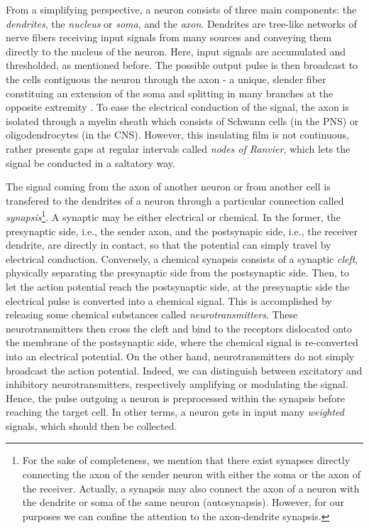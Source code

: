 \documentclass[12pt, a4paper, twoside, openright]{report}
\numberwithin{equation}{chapter}
\theoremstyle{theorem}
\theoremstyle{definition}
\theoremstyle{remark}
\theoremstyle{proposition}
\numberwithin{figure}{chapter}
\begin{document}
		From a simplifying perspective, a neuron consists of three main components: the \emph{dendrites}, the \emph{nucleus} or \emph{soma}, and the \emph{axon}. Dendrites are tree-like networks of nerve fibers receiving input signals from many sources and conveying them directly to the nucleus of the neuron. Here, input signals are accumulated and thresholded, as mentioned before. The possible output pulse is then broadcast to the cells contiguous the neuron through the axon - a unique, slender fiber constituing an extension of the soma and splitting in many branches at the opposite extremity \cite{SD13}. To ease the electrical conduction of the signal, the axon is isolated through a myelin sheath which consists of Schwann cells (in the PNS) or oligodendrocytes (in the CNS). However, this insulating film is not continuous, rather presents gaps at regular intervals called \emph{nodes of Ranvier}, which lets the signal be conducted in a saltatory way.
		
		The signal coming from the axon of another neuron or from another cell is transfered to the dendrites of a neuron through a particular connection called \emph{synapsis}\footnote{For the sake of completeness, we mention that there exist synapses directly connecting the axon of the sender neuron with either the soma or the axon of the receiver. Actually, a synapsis may also connect the axon of a neuron with the dendrite or soma of the same neuron (autosynapsis). However, for our purposes we can confine the attention to the axon-dendrite synapsis.}. A synaptic may be either electrical or chemical. In the former, the presynaptic side, i.e., the sender axon, and the postsynapic side, i.e., the receiver dendrite, are directly in contact, so that the potential can simply travel by electrical conduction. Conversely, a chemical synapsis consists of a synaptic \emph{cleft}, physically separating the presynaptic side from the postsynaptic side. Then, to let the action potential reach the postsynaptic side, at the presynaptic side the electrical pulse is converted into a chemical signal. This is accomplished by releasing some chemical substances called \emph{neurotransmitters}. These neurotransmitters then cross the cleft and bind to the receptors dislocated onto the membrane of the postsynaptic side, where the chemical signal is re-converted into an electrical potential. On the other hand, neurotransmitters do not simply broadcast the action potential. Indeed, we can distinguish between excitatory and inhibitory neurotransmitters, respectively amplifying or modulating the signal. Hence, the pulse outgoing a neuron is preprocessed within the synapsis before reaching the target cell. In other terms, a neuron gets in input many \emph{weighted} signals, which should then be collected.
		
\end{document}
